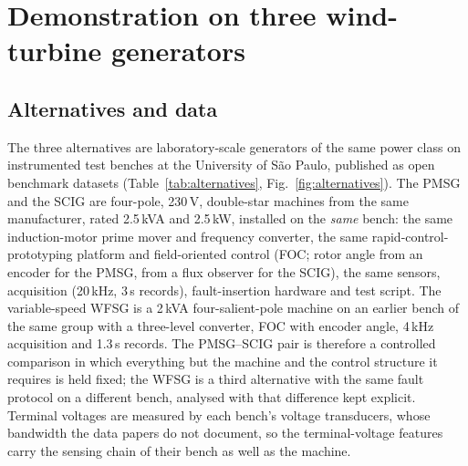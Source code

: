 \section{Demonstration on three wind-turbine generators}\label{sec:demo}

\subsection{Alternatives and data}\label{sec:data}

The three alternatives are laboratory-scale generators of the same power class on instrumented test benches at the University of S\~ao Paulo, published as open benchmark datasets (Table~\ref{tab:alternatives}, Fig.~\ref{fig:alternatives}). The PMSG \citep{Tominaga2025pmsg} and the SCIG \citep{Tominaga2025scig} are four-pole, 230\,V, double-star machines from the same manufacturer, rated 2.5\,kVA and 2.5\,kW, installed on the \emph{same} bench: the same induction-motor prime mover and frequency converter, the same rapid-control-prototyping platform and field-oriented control (FOC; rotor angle from an encoder for the PMSG, from a flux observer for the SCIG), the same sensors, acquisition (20\,kHz, 3\,s records), fault-insertion hardware and test script. The variable-speed WFSG \citep{Tominaga2024gen} is a 2\,kVA four-salient-pole machine on an earlier bench of the same group \citep{Rocha2023} with a three-level converter, FOC with encoder angle, 4\,kHz acquisition and 1.3\,s records. The PMSG--SCIG pair is therefore a controlled comparison in which everything but the machine and the control structure it requires is held fixed; the WFSG is a third alternative with the same fault protocol on a different bench, analysed with that difference kept explicit. Terminal voltages are measured by each bench's voltage transducers, whose bandwidth the data papers do not document, so the terminal-voltage features carry the sensing chain of their bench as well as the machine.

